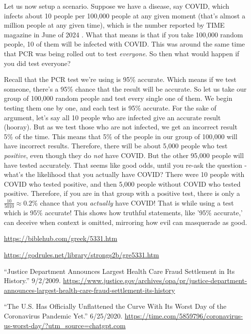 \documentclass[10pt]{article}
\begin{document}
\begin{multicols}{2}
Let us now setup a scenario. Suppose we have a disease, say COVID, which infects about 10 people per 100,000 people at any given moment (that's almost a million people at any given time), which is the number reported by TIME magazine in June of 2024 \cite{TIME}. What that means is that if you take 100,000 random people, 10 of them will be infected with COVID. This was around the same time that PCR was being rolled out to test \textit{everyone}. So then what would happen if you did test everyone?

Recall that the PCR test we're using is 95\% accurate. Which means if we test someone, there's a 95\% chance that the result will be accurate. So let us take our group of 100,000 random people and test every single one of them. We begin testing them one by one, and each test is 95\% accurate. For the sake of argument, let's say all 10 people who are infected give an accurate result (hooray). But as we test those who are not infected, we get an incorrect result 5\% of the time. This means that 5\% of the people in our group of 100,000 will have incorrect results. Therefore, there will be about 5,000 people who test \textit{positive}, even though they do \textit{not} have COVID. But the other 95,000 people will have tested accurately. That seems like good odds, until you re-ask the question - what's the likelihood that you actually have COVID? There were 10 people with COVID who tested positive, and then 5,000 people without COVID who tested positive. Therefore, if you are in that group with a positive test, there is only a $\frac{10}{5010} \approx 0.2\%$ chance that you \textit{actually} have COVID! That is while using a test which is 95\% accurate! This shows how truthful statements, like '95\% accurate,' can deceive when context is omitted, mirroring how evil can masquerade as good.




\begin{thebibliography}{9}
	{\footnotesize
		
	 \url{https://biblehub.com/greek/5331.htm}
	
	 \url{https://godrules.net/library/strongs2b/gre5331.htm}
	
	 ``Justice Department Announces Largest Health Care Fraud Settlement in Its History.'' 9/2/2009. \url{https://www.justice.gov/archives/opa/pr/justice-department-announces-largest-health-care-fraud-settlement-its-history}
	
	 ``The U.S. Has Officially Unflattened the Curve With Its Worst Day of the Coronavirus Pandemic Yet.'' 6/25/2020. \url{https://time.com/5859796/coronavirus-us-worst-day/?utm_source=chatgpt.com}
	
	}
\end{thebibliography}

\end{multicols}


\end{document}
